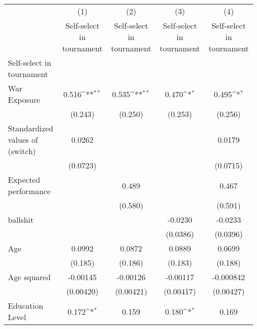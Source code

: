 {
\def\sym#1{\ifmmode^{#1}\else\(^{#1}\)\fi}
\begin{tabular}{l*{4}{c}}
\hline\hline
                    &\multicolumn{1}{c}{(1)}&\multicolumn{1}{c}{(2)}&\multicolumn{1}{c}{(3)}&\multicolumn{1}{c}{(4)}\\
                    &\multicolumn{1}{c}{Self-select in tournament}&\multicolumn{1}{c}{Self-select in tournament}&\multicolumn{1}{c}{Self-select in tournament}&\multicolumn{1}{c}{Self-select in tournament}\\
\hline
Self-select in tournament&                     &                     &                     &                     \\
War Exposure        &       0.516\sym{**} &       0.535\sym{**} &       0.470\sym{*}  &       0.495\sym{*}  \\
                    &     (0.243)         &     (0.250)         &     (0.253)         &     (0.256)         \\
[1em]
Standardized values of (switch)     &      0.0262         &                     &                     &      0.0179         \\
                    &    (0.0723)         &                     &                     &    (0.0715)         \\
[1em]
Expected performance&                     &       0.489         &                     &       0.467         \\
                    &                     &     (0.580)         &                     &     (0.591)         \\
[1em]
ballshit            &                     &                     &     -0.0230         &     -0.0233         \\
                    &                     &                     &    (0.0386)         &    (0.0396)         \\
[1em]
Age                 &      0.0992         &      0.0872         &      0.0889         &      0.0699         \\
                    &     (0.185)         &     (0.186)         &     (0.183)         &     (0.188)         \\
[1em]
Age squared         &    -0.00145         &    -0.00126         &    -0.00117         &   -0.000842         \\
                    &   (0.00420)         &   (0.00421)         &   (0.00417)         &   (0.00427)         \\
[1em]
Education Level     &       0.172\sym{*}  &       0.159         &       0.180\sym{*}  &       0.169         \\

\end{tabular}}

